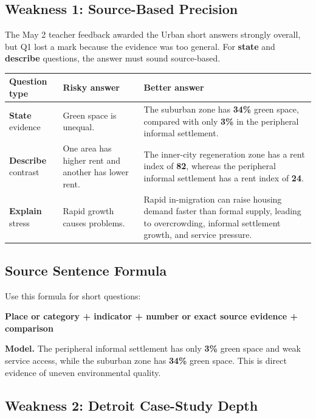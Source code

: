 \documentclass[11pt,a4paper]{article}
\newcommand{\term}[1]{\textcolor{HeadingBlue}{\textbf{#1}}}
\newcommand{\exam}[1]{\textcolor{AccentTeal}{\textbf{#1}}}
\newcommand{\boxnote}[3]{%
\noindent\colorbox{#1}{%
  \begin{minipage}{0.965\textwidth}
  \sffamily
  \textbf{\textcolor{HeadingBlue}{#2}} #3
  \end{minipage}
}}
\begin{document}
\subsection{Weakness 1: Source-Based Precision}

The May 2 teacher feedback awarded the Urban short answers strongly overall,
but Q1 lost a mark because the evidence was too general. For \exam{state} and
\exam{describe} questions, the answer must sound source-based.

\begin{tabularx}{\textwidth}{L{0.24\textwidth}Y Y}
\toprule
\textbf{Question type} & \textbf{Risky answer} & \textbf{Better answer} \\
\midrule
\exam{State} evidence & Green space is unequal. & The suburban zone has
\term{34\%} green space, compared with only \term{3\%} in the peripheral
informal settlement. \\
\exam{Describe} contrast & One area has higher rent and another has lower
rent. & The inner-city regeneration zone has a rent index of \term{82},
whereas the peripheral informal settlement has a rent index of \term{24}. \\
\exam{Explain} stress & Rapid growth causes problems. & Rapid in-migration can
raise housing demand faster than formal supply, leading to overcrowding,
informal settlement growth, and service pressure. \\
\bottomrule
\end{tabularx}

\subsection{Source Sentence Formula}

Use this formula for short questions:

\begin{center}
{\sffamily\bfseries\color{HeadingBlue}
Place or category + indicator + number or exact source evidence + comparison}
\end{center}

\boxnote{SoftGreen}{Model.}{The peripheral informal settlement has only
\term{3\%} green space and weak service access, while the suburban zone has
\term{34\%} green space. This is direct evidence of uneven environmental
quality.}

\subsection{Weakness 2: Detroit Case-Study Depth}
\end{document}

